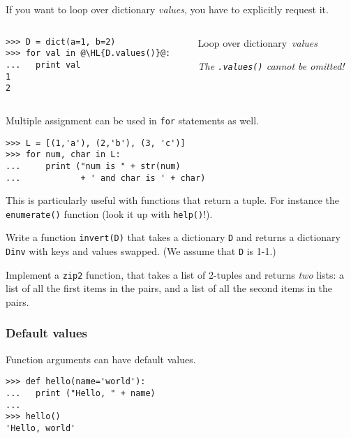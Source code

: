 \documentclass[english,serif,mathserif,xcolor=pdftex,dvipsnames,table]{beamer}
\begin{document}
\begin{frame}[fragile]
  If you want to loop over dictionary \emph{values}, you have to
  explicitly request it.

  \+
  \begin{columns}[c]
    \begin{column}{0.5\textwidth}
\begin{lstlisting}
>>> D = dict(a=1, b=2)
>>> for val in @\HL{D.values()}@:
...   print val
1
2
\end{lstlisting}
    \end{column}
    \begin{column}{0.4\textwidth}
      \raggedleft 
      Loop over dictionary~\emph{values}

      \emph{The \texttt{.values()} cannot be omitted!}
    \end{column}
  \end{columns}
\end{frame}


\begin{frame}[fragile]
  Multiple assignment can be used in \texttt{for} statements as well.
\begin{lstlisting}
>>> L = [(1,'a'), (2,'b'), (3, 'c')]
>>> for num, char in L:
...     print ("num is " + str(num) 
...            + ' and char is ' + char)
\end{lstlisting}

  \+
  This is particularly useful with functions that return a tuple.
  For instance the \texttt{enumerate()} function (look it up with
  \texttt{help()}!).
\end{frame}


\begin{frame}
  \begin{exercise}
    Write a function \texttt{invert(D)} that takes a dictionary
    \texttt{D} and returns a dictionary \texttt{Dinv} with keys and
    values swapped. (We assume that \texttt{D} is 1-1.)
  \end{exercise}

  \+
  \begin{exercise}
    Implement a \texttt{zip2} function, that takes a list of 2-tuples
    and returns \emph{two} lists: a list of all the first items in the
    pairs, and a list of all the second items in the pairs.
  \end{exercise}
\end{frame}


\begin{frame}[fragile]
  \frametitle{Default values}
  
  Function arguments can have default values.
\begin{lstlisting}
>>> def hello(name='world'):
...   print ("Hello, " + name)
... 
>>> hello()
'Hello, world'
\end{lstlisting}
\end{frame}
\end{document}
